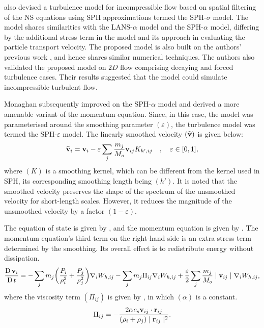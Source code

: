 \cite{Hu2015} also devised a turbulence model for incompressible flow based on spatial filtering of the NS equations using SPH approximations termed the SPH-$\sigma$ model. The model shares similarities with the LANS-$\alpha$ model and the SPH-$\alpha$ model, differing by the additional stress term in the model and its approach in evaluating the particle transport velocity. The proposed model is also built on the authors’ previous work \parencite{hu2007incompressible}, and hence shares similar numerical techniques. The authors also validated the proposed model on $2D$ flow comprising decaying and forced turbulence cases. Their results suggested that the model could simulate incompressible turbulent flow.

Monaghan \parencite{Monaghan2011, Monaghan2017} subsequently improved on the SPH-$\alpha$ model and derived a more amenable variant of the momentum equation. Since, in this case, the model was parameterised around the smoothing parameter $(\varepsilon)$, the turbulence model was termed the SPH-$\varepsilon$ model. The linearly smoothed velocity $(\widehat{\mathbf{v}})$ is given below:
\begin{equation}
    \widehat{\vect{v}}_i = \vect{v}_i - \varepsilon \sum_j \frac{m_j}{M_o} \VIJ K_{h', ij} \quad , \quad \varepsilon \in [0, 1],
    \label{eq:Monaghan2017-xsph-vel-smoothing}
\end{equation}
where $(K)$ is a smoothing kernel, which can be different from the kernel used in SPH, its corresponding smoothing length being $(h')$. It is noted that the smoothed velocity preserves the shape of the spectrum of the unsmoothed velocity for short-length scales. However, it reduces the magnitude of the unsmoothed velocity by a factor $(1-\varepsilon)$. 

The equation of state is given by , and the momentum equation is given by . The momentum equation’s third term on the right-hand side is an extra stress term determined by the smoothing. Its overall effect is to redistribute energy without dissipation.
\begin{equation}
    \LagDerivative{\vect{v}_i} = - \sum_j m_j \bigg( \frac{P_i}{\rho_i^2} + \frac{P_j}{\rho_j^2} \bigg) \DWIJ - \sum_j m_j \Pi_{ij} \DWIJ + \frac{\varepsilon}{2} \sum_j \frac{m_j}{M_o} \VtwoIJ[] \DWIJ ,
    \label{eq:Monaghan2017-mom-governing}
\end{equation}
where the viscosity term $(\Pi_{ij})$ is given by , in which $(\alpha)$ is a constant.
\begin{equation}
    \Pi_{ij} = - \frac{2 \alpha c_s \VIJ \cdot \RIJ}{(\rho_i + \rho_j) \RtwoIJ}.
    \label{eq:Monaghan2017-Pi-visc-term}
\end{equation}

